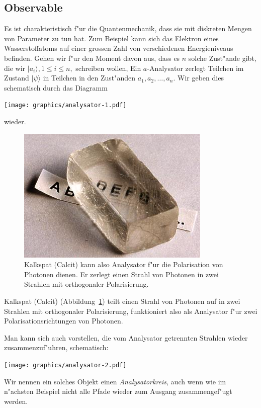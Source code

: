 \subsection{Observable}
Es ist charakteristisch f"ur die Quantenmechanik, dass sie mit diskreten
Mengen von Parameter zu tun hat. Zum Beispiel kann sich das Elektron eines
Wasserstoffatoms auf einer grossen Zahl von verschiedenen Energieniveaus
befinden. Gehen wir f"ur den Moment davon aus, dass es $n$ solche Zust"ande
gibt, die wir $|a_i\rangle, 1\le i\le n,$ schreiben wollen,
Ein $a$-Analysator zerlegt Teilchen im Zustand $|\psi\rangle$ in 
Teilchen in den Zust"anden $a_1,a_2,\dots,a_n$. Wir geben dies
schematisch durch das Diagramm
\begin{center}
\texttt{[image: graphics/analysator-1.pdf]}
\end{center}
wieder.
\begin{figure}
\centering
\includegraphics{images/calcit.jpg}
\caption{Kalkspat (Calcit) kann also Analysator f"ur die Polarisation
von Photonen dienen. Er zerlegt einen Strahl von Photonen in zwei
Strahlen mit orthogonaler Polarisierung.
\label{skript:calcit}}
\end{figure}
Kalkspat (Calcit) (Abbildung~\ref{skript:calcit}) teilt einen Strahl
von Photonen auf in zwei Strahlen mit orthogonaler Polarisierung,
funktioniert also als Analysator f"ur zwei Polarisationsrichtungen
von Photonen.

Man kann sich auch vorstellen, die vom Analysator getrennten Strahlen
wieder zusammenzuf"uhren, schematisch:
\begin{center}
\texttt{[image: graphics/analysator-2.pdf]}
\end{center}
Wir nennen ein solches Objekt einen {\em Analysatorkreis}, auch wenn wie
im n"achsten Beispiel nicht alle Pfade wieder zum Ausgang zusammengef"ugt
werden.

